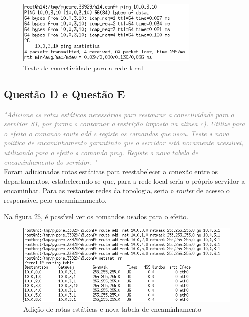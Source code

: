 \documentclass{llncs}
\newcommand{\questionE}[1]{\textcolor{gray}{\textit{"#1"}}}
\begin{document}
\begin{figure}[H]
\begin{center}
\includegraphics[width=9cm]{PARTEB_2c_n14MESMASUBREDEToSv.PNG}
\end{center}
\caption{Teste de conectividade para a rede local}
\end{figure}

\subsection{Questão D e Questão E}
\hspace{3mm}
\questionE{Adicione as rotas estáticas necessárias para restaurar a conectividade para o servidor S1,	por forma a contornar a restrição imposta na alínea c). Utilize para o efeito o comando route add e registe os comandos que usou.
Teste a nova política de encaminhamento garantindo que o servidor está novamente acessível,	utilizando para	o efeito o comando ping. Registe a nova tabela de encaminhamento do servidor.
}\\

Foram adicionadas rotas estáticas para reestabelecer a conexão entre os departamentos, estabelecendo-se que, para a rede local seria o próprio servidor a encaminhar. Para as restantes redes da topologia, seria o \textit{router} de acesso o responsável pelo encaminhamento.

Na figura 26, é possível ver os comandos usados para o efeito.

\begin{figure}[H]
\begin{center}
\includegraphics[width=12cm]{PARTEB_2e_tabelaErouteAdd.PNG}
\end{center}
\caption{Adição de rotas estáticas e nova tabela de encaminhamento}
\end{figure}
\end{document}
